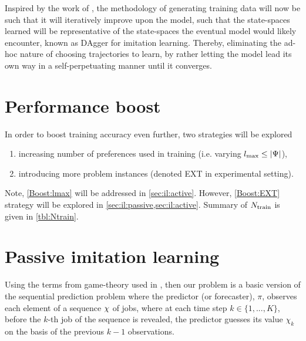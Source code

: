 Inspired by the work of \cite{RossB10,RossGB11}, the methodology of generating 
training data will now be such that it will iteratively improve upon the model, 
such that the state-spaces learned will be representative of the state-spaces 
the eventual model would likely encounter, known as DAgger for imitation 
learning.
Thereby, eliminating the ad-hoc nature of choosing trajectories to learn, by 
rather letting the model lead its own way in a self-perpetuating manner until 
it converges.

\section*{Performance boost}
In order to boost training accuracy even further, two strategies will be 
explored 
\begin{enumerate}[after={{}}, leftmargin=*,
    label={\textbf{Boost.\arabic*}}, ref={{Boost.\arabic*}}]
    \item \label{Boost:lmax} increasing number of preferences used 
    in training (i.e. varying \mbox{$l_{\max} \leq \lvert\Psi\rvert$}),
    \item \label{Boost:EXT} introducing more problem instances 
    (denoted EXT in experimental setting).
\end{enumerate}

Note, \ref{Boost:lmax} will be addressed in \cref{sec:il:active}. 
However, \ref{Boost:EXT} strategy will be explored in 
\cref{sec:il:passive,sec:il:active}. 
Summary of $N_{\text{train}}$ is given in \cref{tbl:Ntrain}.



\section{Passive imitation learning}\label{sec:il:passive}
Using the terms from game-theory used in \citet{CesaBianchi06}, %
then our problem is a basic version of the sequential prediction problem where 
the predictor (or forecaster), $\pi$, observes each element of a sequence 
${\mathbf{\chi}}$ of jobs, where at each time step $k \in \{1,...,K\}$, before the 
$k$-th job of the sequence is revealed, the predictor guesses its value 
$\chi_k$ on the basis of the previous $k-1$ observations. 

